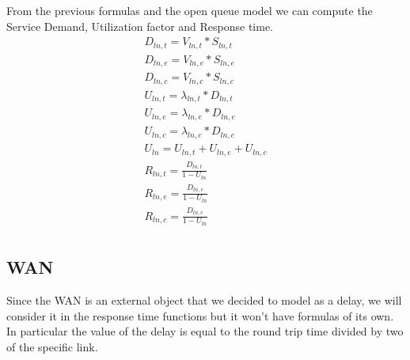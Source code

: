 \documentclass[11pt]{article}
\begin{document}
From the previous formulas and the open queue model we can compute the Service Demand, Utilization factor and Response time.
\begin{equation}
    \begin{array}{l}
        D_{ln, t} = V_{ln, t} * S_{ln, t} \\
        D_{ln, e} = V_{ln, e} * S_{ln, e} \\
        D_{ln, c} = V_{ln, c} * S_{ln, c} \\
        U_{ln, t} = \lambda_{ln, t} * D_{ln, t} \\
        U_{ln, e} = \lambda_{ln, e} * D_{ln, e} \\
        U_{ln, c} = \lambda_{ln, c} * D_{ln, c} \\
        U_{ln} = U_{ln, t} + U_{ln, e} + U_{ln, c} \\
        R_{ln, t} = \frac{D_{ln, t}}{1 - U_{ln}} \\
        R_{ln, e} = \frac{D_{ln, e}}{1 - U_{ln}} \\
        R_{ln, c} = \frac{D_{ln, c}}{1 - U_{ln}} \\
    \end{array}
\end{equation}
\subsection{WAN}
Since the WAN is an external object that we decided to model as a delay, we will consider it in the response time functions but it won't have formulas of its own. In particular the value of the delay is equal to the round trip time divided by two of the specific link.
\end{document}
